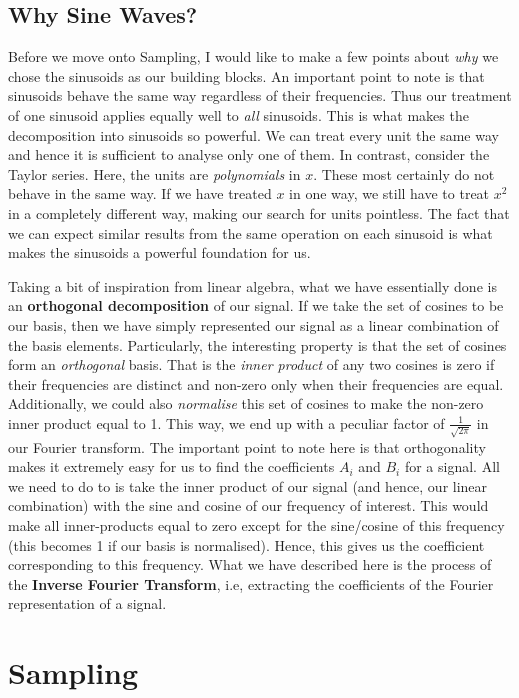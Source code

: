 \documentclass{article}
\theoremstyle{definition}
\begin{document}
	\subsection{Why Sine Waves?}	 
	 Before we move onto Sampling, I would like to make a few points about \textit{why} we chose the sinusoids as our building blocks. An important point to note is that sinusoids behave the same way regardless of their frequencies. Thus our treatment of one sinusoid applies equally well to \textit{all} sinusoids. This is what makes the decomposition into sinusoids so powerful. We can treat every unit the same way and hence it is sufficient to analyse only one of them. In  contrast, consider the Taylor series. Here, the units are \textit{polynomials} in $x$. These most certainly do not behave in the same way. If we have treated $x$ in one way, we still have to treat $x^2$ in a completely different way, making our search for units pointless. The fact that we can expect similar results from the same operation on each sinusoid is what makes the sinusoids a powerful foundation for us. \smallskip
	 
	 Taking a bit of inspiration from linear algebra, what we have essentially done is an \textbf{orthogonal decomposition} of our signal. If we take the set of cosines to be our basis, then we have simply represented our signal as a linear combination of the basis elements. Particularly, the interesting property is that the set of cosines form an \textit{orthogonal} basis. That is the \textit{inner product} of any two cosines is zero if their frequencies are distinct and non-zero only when their frequencies are equal. Additionally, we could also \textit{normalise} this set of cosines to make the non-zero inner product equal to 1. This way, we end up with a peculiar factor of $\frac{1}{\sqrt{2\pi}}$ in our Fourier transform. The important point to note here is that orthogonality makes it extremely easy for us to find the coefficients $A_i$ and $B_i$ for a signal. All we need to do to is take the inner product of our signal (and hence, our linear combination) with the sine and cosine of our frequency of interest. This would make all inner-products equal to zero except for the sine/cosine of this frequency (this becomes 1 if our basis is normalised). Hence, this gives us the coefficient corresponding to this frequency. What we have described here is the process of the \textbf{Inverse Fourier Transform}, i.e, extracting the coefficients of the Fourier representation of a signal. 
	 \bigskip
	 
	 \section{Sampling}
\end{document}
